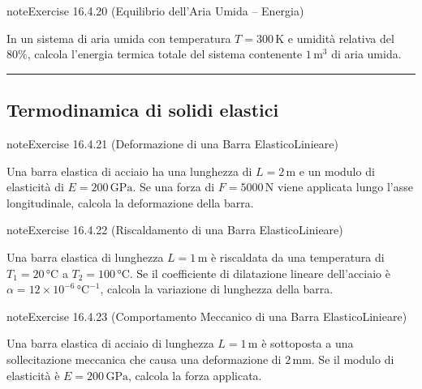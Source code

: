 \documentclass[letterpaper,10pt,italian]{jupyterBook}
\begin{document}
\begin{sphinxadmonition}{note}{Exercise 16.4.20 (Equilibrio dell’Aria Umida – Energia)}



\sphinxAtStartPar
In un sistema di aria umida con temperatura \(T = 300 \, \text{K}\) e umidità relativa del \(80\%\), calcola l’energia termica totale del sistema contenente \(1 \, \text{m}^3\) di aria umida.
\end{sphinxadmonition}


\bigskip\hrule\bigskip



\subsection{Termodinamica di solidi elastici}
\label{\detokenize{ch/thermodynamics/matter-problems:termodinamica-di-solidi-elastici}} \label{exercise:ch/thermodynamics/matter-problems-exercise-20}

\begin{sphinxadmonition}{note}{Exercise 16.4.21 (Deformazione di una Barra Elastico\sphinxhyphen{}Linieare)}



\sphinxAtStartPar
Una barra elastica di acciaio ha una lunghezza di \(L = 2 \, \text{m}\) e un modulo di elasticità di \(E = 200 \, \text{GPa}\). Se una forza di \(F = 5000 \, \text{N}\) viene applicata lungo l’asse longitudinale, calcola la deformazione della barra.
\end{sphinxadmonition}
 \label{exercise:ch/thermodynamics/matter-problems-exercise-21}

\begin{sphinxadmonition}{note}{Exercise 16.4.22 (Riscaldamento di una Barra Elastico\sphinxhyphen{}Linieare)}



\sphinxAtStartPar
Una barra elastica di lunghezza \(L = 1 \, \text{m}\) è riscaldata da una temperatura di \(T_1 = 20 \, \text{°C}\) a \(T_2 = 100 \, \text{°C}\). Se il coefficiente di dilatazione lineare dell’acciaio è \( \alpha = 12 \times 10^{-6} \, \text{°C}^{-1}\), calcola la variazione di lunghezza della barra.
\end{sphinxadmonition}
 \label{exercise:ch/thermodynamics/matter-problems-exercise-22}

\begin{sphinxadmonition}{note}{Exercise 16.4.23 (Comportamento Meccanico di una Barra Elastico\sphinxhyphen{}Linieare)}



\sphinxAtStartPar
Una barra elastica di acciaio di lunghezza \(L = 1 \, \text{m}\) è sottoposta a una sollecitazione meccanica che causa una deformazione di \(2 \, \text{mm}\). Se il modulo di elasticità è \(E = 200 \, \text{GPa}\), calcola la forza applicata.
\end{sphinxadmonition}
\end{document}

